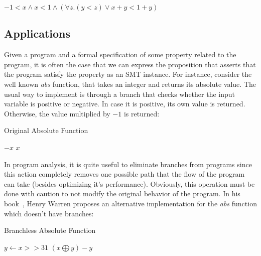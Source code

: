 \begin{center}
  $-1 < x \land x < 1 \land (\forall z . (y < z) \lor x + y < 1 + y)$
\end{center}



\subsection{Applications}

Given a program and a formal specification of some property related to the program, it is often  the case that we can express the proposition that asserts that the program satisfy the property as an SMT instance. For instance, consider the well known \textit{abs} function, that takes an integer and returns its absolute value. The usual way to implement is through a branch that checks whether the input variable is positive or negative. In case it is positive, its own value is returned. Otherwise, the value multiplied by $-1$ is returned:

\begin{algorithm}
\caption{Original Absolute Function}
\begin{algorithmic}
    \State \Return $-x$
  \Else
    \State \Return $x$
  \EndIf
\EndFunction
\end{algorithmic}
\end{algorithm}

In program analysis, it is quite useful to eliminate branches from programs since this action completely removes one possible path that the flow of the program can take (besides optimizing it's performance). Obviously, this operation must be done with caution to not modify the original behavior of the program. In his book~\cite{hacker_delight}, Henry Warren proposes an alternative implementation for the \textit{abs} function which doesn't have branches:

\begin{algorithm}
\caption{Branchless Absolute Function}
\begin{algorithmic}
  \State $y \gets x >> 31$
  \State \Return $(x \bigoplus y) - y$
\EndFunction
\end{algorithmic}
\end{algorithm}


